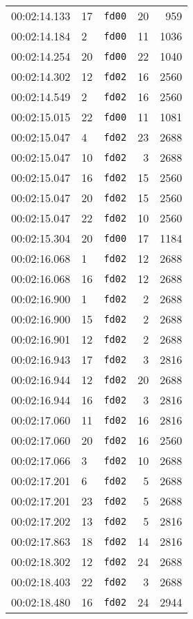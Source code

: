 \documentclass{article}
\begin{document}
\begin{longtable}{lllrr}
00:02:14.133 & 17 & \texttt{fd00} & 20 & 959 \\
00:02:14.184 & 2 & \texttt{fd00} & 11 & 1036 \\
00:02:14.254 & 20 & \texttt{fd00} & 22 & 1040 \\
00:02:14.302 & 12 & \texttt{fd02} & 16 & 2560 \\
00:02:14.549 & 2 & \texttt{fd02} & 16 & 2560 \\
00:02:15.015 & 22 & \texttt{fd00} & 11 & 1081 \\
00:02:15.047 & 4 & \texttt{fd02} & 23 & 2688 \\
00:02:15.047 & 10 & \texttt{fd02} & 3 & 2688 \\
00:02:15.047 & 16 & \texttt{fd02} & 15 & 2560 \\
00:02:15.047 & 20 & \texttt{fd02} & 15 & 2560 \\
00:02:15.047 & 22 & \texttt{fd02} & 10 & 2560 \\
00:02:15.304 & 20 & \texttt{fd00} & 17 & 1184 \\
00:02:16.068 & 1 & \texttt{fd02} & 12 & 2688 \\
00:02:16.068 & 16 & \texttt{fd02} & 12 & 2688 \\
00:02:16.900 & 1 & \texttt{fd02} & 2 & 2688 \\
00:02:16.900 & 15 & \texttt{fd02} & 2 & 2688 \\
00:02:16.901 & 12 & \texttt{fd02} & 2 & 2688 \\
00:02:16.943 & 17 & \texttt{fd02} & 3 & 2816 \\
00:02:16.944 & 12 & \texttt{fd02} & 20 & 2688 \\
00:02:16.944 & 16 & \texttt{fd02} & 3 & 2816 \\
00:02:17.060 & 11 & \texttt{fd02} & 16 & 2816 \\
00:02:17.060 & 20 & \texttt{fd02} & 16 & 2560 \\
00:02:17.066 & 3 & \texttt{fd02} & 10 & 2688 \\
00:02:17.201 & 6 & \texttt{fd02} & 5 & 2688 \\
00:02:17.201 & 23 & \texttt{fd02} & 5 & 2688 \\
00:02:17.202 & 13 & \texttt{fd02} & 5 & 2816 \\
00:02:17.863 & 18 & \texttt{fd02} & 14 & 2816 \\
00:02:18.302 & 12 & \texttt{fd02} & 24 & 2688 \\
00:02:18.403 & 22 & \texttt{fd02} & 3 & 2688 \\
00:02:18.480 & 16 & \texttt{fd02} & 24 & 2944 \\

\end{longtable}
\end{document}
